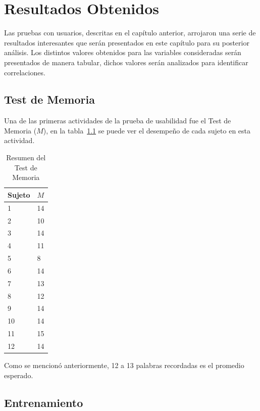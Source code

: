 \chapter{Resultados Obtenidos}
\label{sec:resultados}


Las pruebas con usuarios, descritas en el cap\'itulo anterior, arrojaron una serie de
resultados interesantes que ser\'an presentados en este cap\'itulo para su posterior an\'alisis. Los
distintos valores obtenidos para las variables consideradas ser\'an presentados de manera tabular, dichos
valores ser\'an analizados para identificar correlaciones.


\section{Test de Memoria}

Una de las primeras actividades de la prueba de usabilidad fue el Test de Memoria ($M$), en la tabla~\ref{sec:tabla-memoria}
se puede ver el desempe\~no de cada sujeto en esta actividad.

\begin{table}[H]
\centering
\footnotesize
\begin{tabular}{|p{1.6cm}|p{1.6cm}|}
\hline
    Sujeto & $M$ \\
    \hline 
    1 & 14 \\
    2 & 10 \\
    3 & 14 \\
    4 & 11 \\
    5 & 8 \\
    6 & 14 \\
    7 & 13 \\
    8 & 12 \\
    9 & 14 \\
    10 & 14 \\
    11 & 15 \\
    12 & 14 \\
\hline
\end{tabular}
\caption{Resumen del Test de Memoria}
\label{sec:tabla-memoria}
\end{table}

Como se mencion\'o anteriormente, 12 a 13 palabras recordadas es el promedio esperado. 
 
\section{Entrenamiento}


